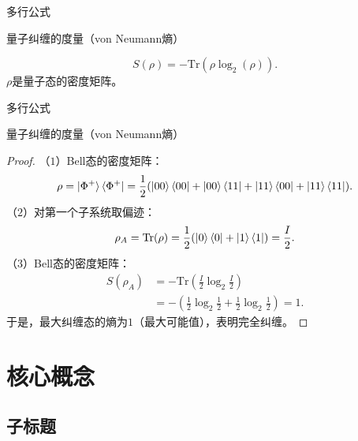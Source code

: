 \documentclass{beamer}
\begin{document}
\begin{frame}{多行公式}
    \begin{exampleblock}{量子纠缠的度量（von Neumann熵）}
        \begin{definition}
            \begin{equation}
                S(\rho)=-\mathrm{Tr}(\rho\log_2(\rho)).
            \end{equation}
            $\rho$是量子态的密度矩阵。
        \end{definition}
    \end{exampleblock}
\end{frame}

\begin{frame}{多行公式}
    \begin{exampleblock}{量子纠缠的度量（von Neumann熵）}
        \begin{proof}
            \tiny
            （$1$）Bell态的密度矩阵：
            \begin{equation}
                \rho=\ket{\Phi^+}\bra{\Phi^+}=\frac{1}{2}(\ket{00}\bra{00}+\ket{00}\bra{11}+\ket{11}\bra{00}+\ket{11}\bra{11}).
            \end{equation}
            （$2$）对第一个子系统取偏迹：
            \begin{equation}
                \rho_A=\mathrm{Tr}(\rho)=\frac{1}{2}(\ket{0}\bra{0}+\ket{1}\bra{1})=\frac{I}{2}.
            \end{equation}
            （$3$）Bell态的密度矩阵：
            \begin{equation}
                \begin{aligned}
                    S(\rho_A) &= -\mathrm{Tr}\left(\frac{I}{2}\log_2\frac{I}{2}\right) \\
                    &= -\left(\frac{1}{2}\log_2\frac{1}{2}+\frac{1}{2}\log_2\frac{1}{2}\right) = 1.
                \end{aligned}
            \end{equation}
            于是，最大纠缠态的熵为$1$（最大可能值），表明完全纠缠。
        \end{proof}
    \end{exampleblock}
\end{frame}

\section{核心概念}

\subsection{子标题}
\end{document}
